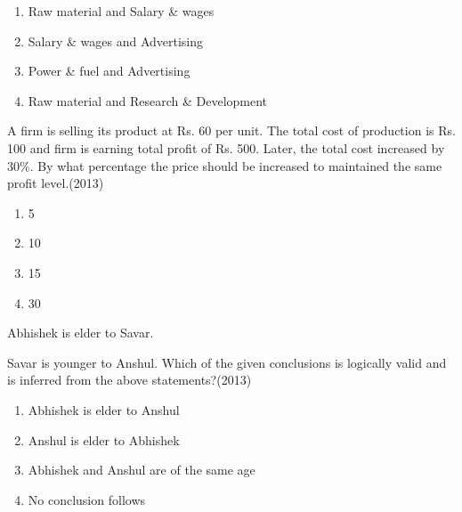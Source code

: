 			\begin{enumerate}
   \item Raw material and Salary \& wages
\item Salary \& wages and Advertising
\item  Power \& fuel and Advertising
\item Raw material and Research \& Development
 \end{enumerate}
	
  \item   A firm is selling its product at Rs. 60 per unit. The total cost of production is Rs. 100 and firm is earning total profit of Rs. 500. Later, the total cost increased by $30 \%$. By what percentage the price should be increased to maintained the same profit level.(\hfill{2013})

  

\begin{multicols}{4}
			\begin{enumerate}
   \item 5
\item 10
\item15
\item 30
\end{enumerate}
		\end{multicols}
  \item   Abhishek is elder to Savar.

Savar is younger to Anshul.
Which of the given conclusions is logically valid and is inferred from the above statements?(\hfill{2013})

 
			\begin{enumerate}
   \item Abhishek is elder to Anshul
\item Anshul is elder to Abhishek
\item  Abhishek and Anshul are of the same age
\item No conclusion follows
  \end{enumerate}
		
 
